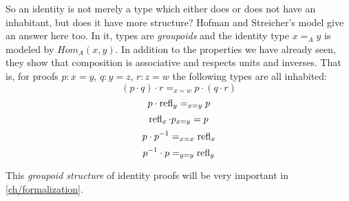 So an identity is not merely a type which either does or does not have an
inhabitant, but does it have more structure?
Hofman and Streicher's model give an answer here too. In it, types are \emph{groupoids} and the
identity type $x =_A y$ is modeled by $Hom_A(x, y)$. In addition to the
properties we have already seen, they show that composition is associative and
respects units and inverses. That is, for proofs $p : x = y$, $q : y = z$, $r :
z = w$ the following types are all inhabited:
\[(p \cdot q) \cdot r =_{x = w} p \cdot (q \cdot r)\]
\[p \cdot \operatorname{refl}_y =_{x = y} p\]
\[\operatorname{refl}_x \cdot p_{x = y} = p\]
\[p \cdot p^{-1} =_{x = x} \operatorname{refl}_x\]
\[p^{-1} \cdot p =_{y = y} \operatorname{refl}_y\]

This \emph{groupoid structure} of identity proofs will be very important in \autoref{ch/formalization}.
